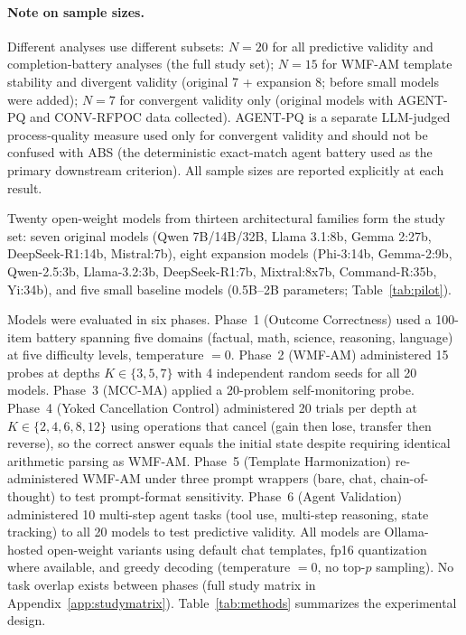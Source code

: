 \documentclass{article}
\begin{document}
\paragraph{Note on sample sizes.} Different analyses use different subsets:
$N{=}20$ for all predictive validity and completion-battery analyses
(the full study set); $N{=}15$ for WMF-AM template stability and
divergent validity (original 7 + expansion 8; before small models
were added); $N{=}7$ for convergent validity only (original models
with AGENT-PQ and CONV-RFPOC data collected).
AGENT-PQ is a separate LLM-judged process-quality measure used only for
convergent validity and should not be confused with ABS (the deterministic
exact-match agent battery used as the primary downstream criterion).
All sample sizes are reported explicitly at each result.

{\sloppy
Twenty open-weight models from thirteen architectural families form the
study set: seven original models (Qwen 7B/14B/32B, Llama 3.1:8b,
Gemma 2:27b, DeepSeek-R1:14b, Mistral:7b), eight expansion models
(Phi-3:14b, Gemma-2:9b, Qwen-2.5:3b, Llama-3.2:3b, DeepSeek-R1:7b,
Mixtral:8x7b, Command-R:35b, Yi:34b), and five small baseline models
(0.5B--2B parameters; Table~\ref{tab:pilot}).
\par}
Models were evaluated in six phases. Phase~1 (Outcome Correctness)
used a 100-item battery spanning five domains (factual, math, science,
reasoning, language) at five difficulty levels, temperature $= 0$.
Phase~2 (WMF-AM) administered 15 probes at depths $K \in \{3,5,7\}$
with 4 independent random seeds for all 20 models.
Phase~3 (MCC-MA) applied a 20-problem self-monitoring probe.
Phase~4 (Yoked Cancellation Control) administered 20 trials per depth at
$K \in \{2,4,6,8,12\}$ using operations that cancel (gain then lose,
transfer then reverse), so the correct answer equals the initial state
despite requiring identical arithmetic parsing as WMF-AM.
Phase~5 (Template Harmonization) re-administered WMF-AM under three
prompt wrappers (bare, chat, chain-of-thought) to test prompt-format
sensitivity.
Phase~6 (Agent Validation) administered 10 multi-step agent tasks
(tool use, multi-step reasoning, state tracking) to all 20 models
to test predictive validity.
All models are Ollama-hosted open-weight variants using default chat
templates, fp16 quantization where available, and greedy decoding
(temperature $= 0$, no top-$p$ sampling). No task overlap exists
between phases (full study matrix in Appendix~\ref{app:studymatrix}).
Table~\ref{tab:methods} summarizes the experimental design.
\end{document}
